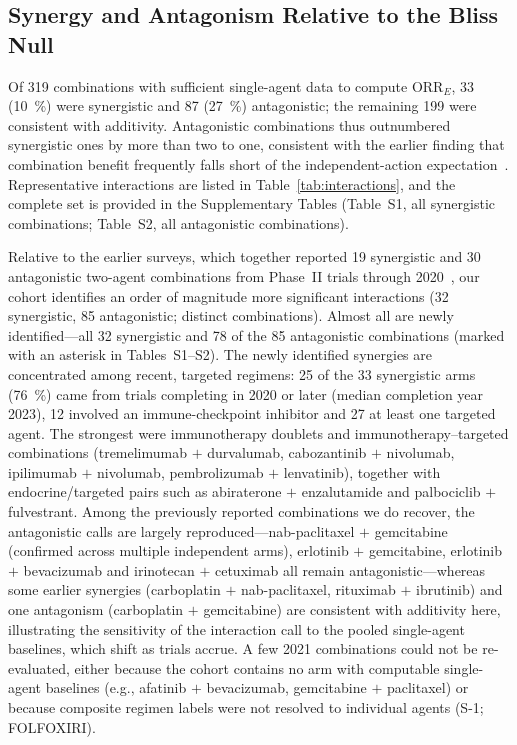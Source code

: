 \documentclass[cancers,article,submit,pdftex,moreauthors]{Definitions/mdpi}
\begin{document}
\subsection{Synergy and Antagonism Relative to the Bliss Null}
Of \num{319} combinations with sufficient single-agent data to compute
$\mathrm{ORR}_{E}$, \num{33} (\SI{10}{\percent}) were synergistic and \num{87}
(\SI{27}{\percent}) antagonistic; the remaining \num{199} were consistent with
additivity. Antagonistic combinations thus outnumbered synergistic ones by more than
two to one, consistent with the earlier finding that combination benefit frequently
falls short of the independent-action expectation~\cite{kang2013,azam2021}.
Representative interactions are listed in Table~\ref{tab:interactions}, and the
complete set is provided in the Supplementary Tables (Table~S1, all synergistic
combinations; Table~S2, all antagonistic combinations).

Relative to the earlier surveys, which together reported \num{19} synergistic and
\num{30} antagonistic two-agent combinations from Phase~II trials through
2020~\cite{kang2013,azam2021}, our cohort identifies an order of magnitude more
significant interactions (\num{32} synergistic, \num{85} antagonistic; distinct
combinations). Almost all are newly identified---all \num{32} synergistic and
\num{78} of the \num{85} antagonistic combinations (marked with an asterisk in
Tables~S1--S2). The newly identified synergies are concentrated among recent,
targeted regimens: \num{25} of the \num{33} synergistic arms (\SI{76}{\percent})
came from trials completing in 2020 or later (median completion year 2023), \num{12}
involved an immune-checkpoint inhibitor and \num{27} at least one targeted agent. The
strongest were immunotherapy doublets and immunotherapy--targeted combinations
(tremelimumab $+$ durvalumab, cabozantinib $+$ nivolumab, ipilimumab $+$ nivolumab,
pembrolizumab $+$ lenvatinib), together with endocrine/targeted pairs such as
abiraterone $+$ enzalutamide and palbociclib $+$ fulvestrant. Among the previously
reported combinations we do recover, the antagonistic calls are largely
reproduced---nab-paclitaxel $+$ gemcitabine (confirmed across multiple independent
arms), erlotinib $+$ gemcitabine, erlotinib $+$ bevacizumab and irinotecan $+$
cetuximab all remain antagonistic---whereas some earlier synergies
(carboplatin $+$ nab-paclitaxel, rituximab $+$ ibrutinib) and one antagonism
(carboplatin $+$ gemcitabine) are consistent with additivity here, illustrating the
sensitivity of the interaction call to the pooled single-agent baselines, which
shift as trials accrue. A few 2021 combinations could not be re-evaluated, either
because the cohort contains no arm with computable single-agent baselines (e.g.,
afatinib $+$ bevacizumab, gemcitabine $+$ paclitaxel) or because composite regimen
labels were not resolved to individual agents (S-1; FOLFOXIRI).
\end{document}
